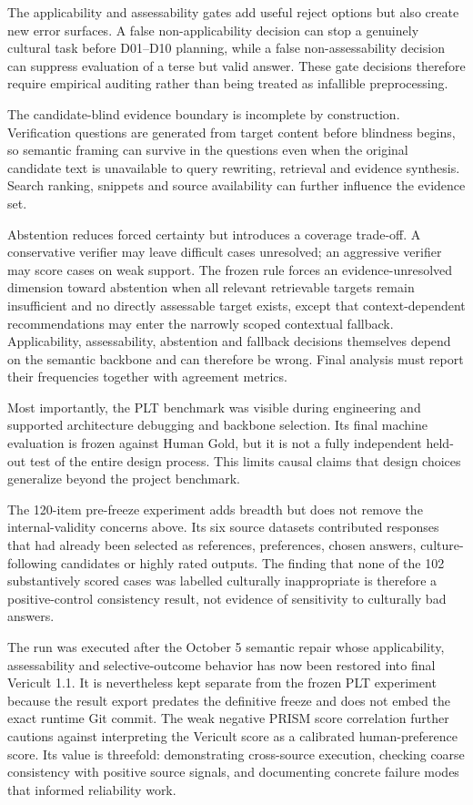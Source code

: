 The applicability and assessability gates add useful reject options but also create new error surfaces. A false non-applicability decision can stop a genuinely cultural task before D01--D10 planning, while a false non-assessability decision can suppress evaluation of a terse but valid answer. These gate decisions therefore require empirical auditing rather than being treated as infallible preprocessing.

The candidate-blind evidence boundary is incomplete by construction. Verification questions are generated from target content before blindness begins, so semantic framing can survive in the questions even when the original candidate text is unavailable to query rewriting, retrieval and evidence synthesis. Search ranking, snippets and source availability can further influence the evidence set.

Abstention reduces forced certainty but introduces a coverage trade-off. A conservative verifier may leave difficult cases unresolved; an aggressive verifier may score cases on weak support. The frozen rule forces an evidence-unresolved dimension toward abstention when all relevant retrievable targets remain insufficient and no directly assessable target exists, except that context-dependent recommendations may enter the narrowly scoped contextual fallback. Applicability, assessability, abstention and fallback decisions themselves depend on the semantic backbone and can therefore be wrong. Final analysis must report their frequencies together with agreement metrics.

Most importantly, the PLT benchmark was visible during engineering and supported architecture debugging and backbone selection. Its final machine evaluation is frozen against Human Gold, but it is not a fully independent held-out test of the entire design process. This limits causal claims that design choices generalize beyond the project benchmark.

The 120-item pre-freeze experiment adds breadth but does not remove the internal-validity concerns above. Its six source datasets contributed responses that had already been selected as references, preferences, chosen answers, culture-following candidates or highly rated outputs. The finding that none of the 102 substantively scored cases was labelled culturally inappropriate is therefore a positive-control consistency result, not evidence of sensitivity to culturally bad answers.

The run was executed after the October 5 semantic repair whose applicability, assessability and selective-outcome behavior has now been restored into final Vericult 1.1. It is nevertheless kept separate from the frozen PLT experiment because the result export predates the definitive freeze and does not embed the exact runtime Git commit. The weak negative PRISM score correlation further cautions against interpreting the Vericult score as a calibrated human-preference score. Its value is threefold: demonstrating cross-source execution, checking coarse consistency with positive source signals, and documenting concrete failure modes that informed reliability work.

